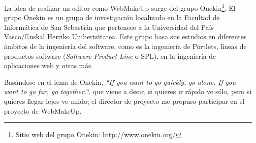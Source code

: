 La idea de realizar un editor como WebMakeUp surge del grupo Onekin\footnote{Sitio web del grupo Onekin: http://www.onekin.org/}. El grupo Onekin es un grupo de investigación localizado en la Facultad de Informática de San Sebastián que pertenece a la Universidad del País Vasco/Euskal Herriko Unibertsitatea. Este grupo basa sus estudios en diferentes ámbitos de la ingeniería del software, como es la ingeniería de Portlets, líneas de productos software (\emph{Software Product Line} o SPL), en la ingeniería de aplicaciones web y otras más.

Basándose en el lema de Onekin, \emph{``If you want to go quickly, go alone. If you want to go far, go together.``}, que viene a decir, si quieres ir rápido ve sólo, pero si quieres llegar lejos ve unido; el director de proyecto me propuso participar en el proyecto de WebMakeUp.